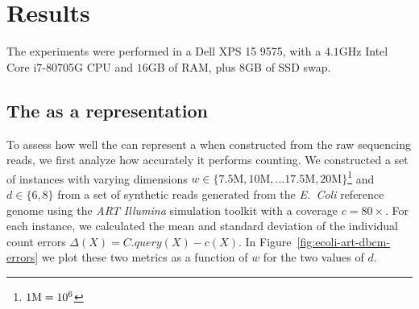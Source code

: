 \chapter{Results}

The experiments were performed in a Dell XPS 15 9575, with a $4.1$GHz Intel Core i7-80705G CPU and $16$GB of RAM, plus $8$GB of SSD swap. 

\section{The \dBCM as a \dBG representation}
\label{sec:results-dbcm-counting}

To assess how well the \dBCM can represent a \dBG when constructed from the raw sequencing reads, we first analyze how accurately it performs \kmer counting. We constructed a set of \dBCM instances with varying dimensions $w \in \{7.5\text{M}, 10\text{M}, \ldots 17.5\text{M}, 20\text{M}\}$\footnote{$1\mega = 10^6$} and $d \in \{6, 8\}$ from a set of synthetic reads generated from the \emph{E.~Coli} reference genome \cite{ecoligenome} using the \emph{ART Illumina} simulation toolkit \cite{Huang2011} with a coverage $c=80\times$. For each instance, we calculated the mean and standard deviation of the individual count errors $\Delta(X) = C.\mathit{query}(X) - c(X)$. In Figure~\ref{fig:ecoli-art-dbcm-errors} we plot these two metrics as a function of $w$ for the two values of $d$.

